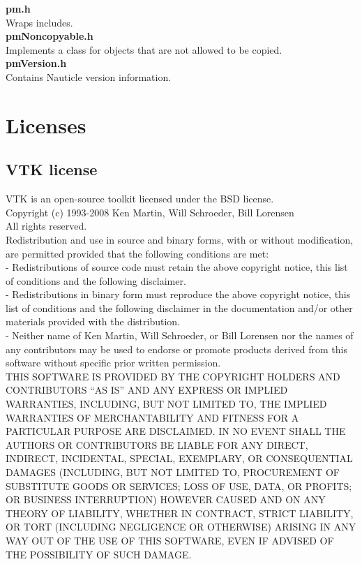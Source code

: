 \documentclass[a4paper,12pt,openany]{book}
\theoremstyle{break}
\begin{document}
\textbf{pm.h}\\
Wraps includes.\\

\textbf{pmNoncopyable.h}\\
Implements a class for objects that are not allowed to be copied.\\

\textbf{pmVersion.h}\\
Contains Nauticle version information.\\




\section{Licenses}
\subsection{VTK license}
VTK is an open-source toolkit licensed under the BSD license.\\
Copyright (c) 1993-2008 Ken Martin, Will Schroeder, Bill Lorensen \\
All rights reserved.\\
Redistribution and use in source and binary forms, with or without modification, are permitted provided that the following conditions are met: \\
- Redistributions of source code must retain the above copyright notice, this list of conditions and the following disclaimer. \\
- Redistributions in binary form must reproduce the above copyright notice, this list of conditions and the following disclaimer in the documentation and/or other materials provided with the distribution. \\
- Neither name of Ken Martin, Will Schroeder, or Bill Lorensen nor the names of any contributors may be used to endorse or promote products derived from this software without specific prior written permission.\\

THIS SOFTWARE IS PROVIDED BY THE COPYRIGHT HOLDERS AND CONTRIBUTORS “AS IS” AND ANY EXPRESS OR IMPLIED WARRANTIES, INCLUDING, BUT NOT LIMITED TO, THE IMPLIED WARRANTIES OF MERCHANTABILITY AND FITNESS FOR A PARTICULAR PURPOSE ARE DISCLAIMED. IN NO EVENT SHALL THE AUTHORS OR CONTRIBUTORS BE LIABLE FOR ANY DIRECT, INDIRECT, INCIDENTAL, SPECIAL, EXEMPLARY, OR CONSEQUENTIAL DAMAGES (INCLUDING, BUT NOT LIMITED TO, PROCUREMENT OF SUBSTITUTE GOODS OR SERVICES; LOSS OF USE, DATA, OR PROFITS; OR BUSINESS INTERRUPTION) HOWEVER CAUSED AND ON ANY THEORY OF LIABILITY, WHETHER IN CONTRACT, STRICT LIABILITY, OR TORT (INCLUDING NEGLIGENCE OR OTHERWISE) ARISING IN ANY WAY OUT OF THE USE OF THIS SOFTWARE, EVEN IF ADVISED OF THE POSSIBILITY OF SUCH DAMAGE.
\end{document}
